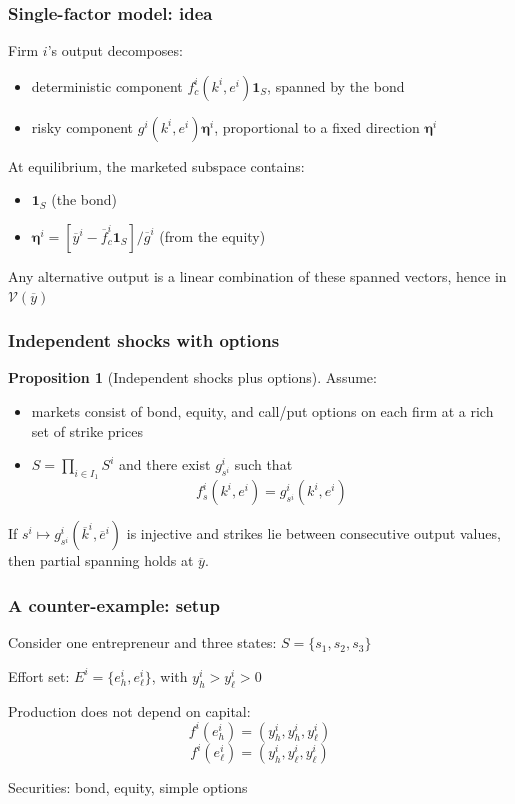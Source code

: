 \documentclass[blue]{beamer}
\def\1{\mathbf{1}}
\theoremstyle{definition}
\theoremstyle{example}
\newtheorem*{proposition}{Proposition}
\begin{document}
\begin{frame}\frametitle{Single-factor model: idea}
Firm $i$'s output decomposes:
\begin{itemize}
\item deterministic component $f^i_c(k^i, e^i) \1_S$, spanned by the bond
\item risky component $g^i(k^i, e^i) \bm{\eta}^i$, proportional to a fixed direction $\bm{\eta}^i$
\end{itemize}
\bigskip

At equilibrium, the marketed subspace contains:
\begin{itemize}
\item $\1_S$ (the bond)
\item $\bm{\eta}^i = [\overline{y}^i - \overline{f}^i_c \1_S] / \overline{g}^i$ (from the equity)
\end{itemize}
\bigskip

Any alternative output is a linear combination of these spanned vectors, hence in $\mathcal{V}(\overline{y})$
\end{frame}

\begin{frame}\frametitle{Independent shocks with options}
\begin{proposition}[Independent shocks plus options]
Assume:
\begin{itemize}
\item[(a)] markets consist of bond, equity, and call/put options on each firm at a rich set of strike prices
\item[(b)] $S = \prod_{i \in I_1} S^i$ and there exist $g^i_{s^i}$ such that
\begin{equation*}
f^i_s(k^i, e^i) = g^i_{s^i}(k^i, e^i)
\end{equation*}
\end{itemize}
If $s^i \mapsto g^i_{s^i}(\overline{k}^i, \overline{e}^i)$ is injective and strikes lie between consecutive output values, then partial spanning holds at $\overline{y}$.
\end{proposition}
\end{frame}

\begin{frame}\frametitle{A counter-example: setup}
Consider one entrepreneur and three states: $S = \{s_1, s_2, s_3\}$
\bigskip

Effort set: $E^i = \{e^i_h, e^i_\ell\}$, with $y^i_h > y^i_\ell > 0$
\bigskip

Production does not depend on capital:
\begin{equation*}
f^i(e^i_h) = (y^i_h, y^i_h, y^i_\ell)
\end{equation*}
\begin{equation*}
f^i(e^i_\ell) = (y^i_h, y^i_\ell, y^i_\ell)
\end{equation*}
\bigskip

Securities: bond, equity, simple options
\end{frame}
\end{document}
